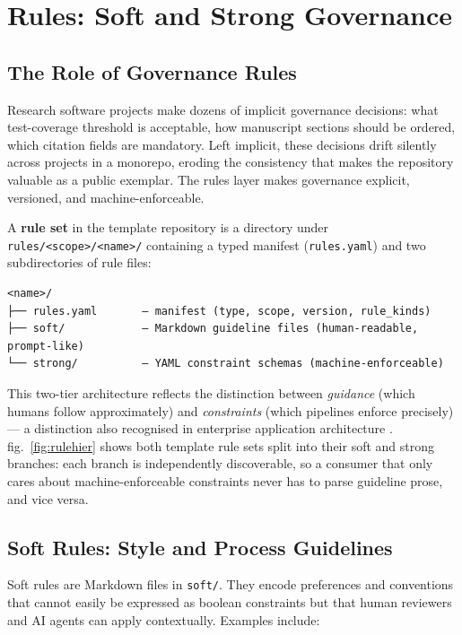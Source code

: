 \documentclass[
]{article}
\begin{document}
\newpage

\section{Rules: Soft and Strong Governance}\label{sec:rules}

\subsection{The Role of Governance
Rules}\label{the-role-of-governance-rules}

Research software projects make dozens of implicit governance decisions:
what test-coverage threshold is acceptable, how manuscript sections
should be ordered, which citation fields are mandatory. Left implicit,
these decisions drift silently across projects in a monorepo, eroding
the consistency that makes the repository valuable as a public exemplar.
The rules layer makes governance explicit, versioned, and
machine-enforceable.

A \textbf{rule set} in the template repository is a directory under
\texttt{rules/\textless{}scope\textgreater{}/\textless{}name\textgreater{}/}
containing a typed manifest (\texttt{rules.yaml}) and two subdirectories
of rule files:

\begin{verbatim}
<name>/
├── rules.yaml       — manifest (type, scope, version, rule_kinds)
├── soft/            — Markdown guideline files (human-readable, prompt-like)
└── strong/          — YAML constraint schemas (machine-enforceable)
\end{verbatim}

This two-tier architecture reflects the distinction between
\emph{guidance} (which humans follow approximately) and
\emph{constraints} (which pipelines enforce precisely) --- a distinction
also recognised in enterprise application architecture
\citep{Fowler2002patterns}. fig.~\ref{fig:rulehier} shows both template
rule sets split into their soft and strong branches: each branch is
independently discoverable, so a consumer that only cares about
machine-enforceable constraints never has to parse guideline prose, and
vice versa.

\subsection{Soft Rules: Style and Process
Guidelines}\label{soft-rules-style-and-process-guidelines}

Soft rules are Markdown files in \texttt{soft/}. They encode preferences
and conventions that cannot easily be expressed as boolean constraints
but that human reviewers and AI agents can apply contextually. Examples
include:
\end{document}
